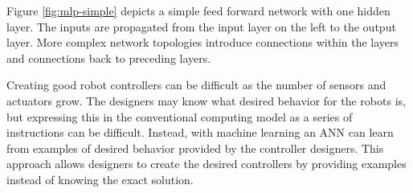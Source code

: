 Figure \ref{fig:mlp-simple} depicts a simple feed forward network with one hidden layer.
The inputs are propagated from the input layer on the left to the output layer.
More complex network topologies introduce connections within the layers and connections back to preceding layers.

Creating good robot controllers can be difficult as the number of sensors and actuators grow.
The designers may know what desired behavior for the robots is, but expressing this in the conventional computing model as a series of instructions can be difficult.
Instead, with machine learning an ANN can learn from examples of desired behavior provided by the controller designers.
This approach allows designers to create the desired controllers by providing examples instead of knowing the exact solution.







